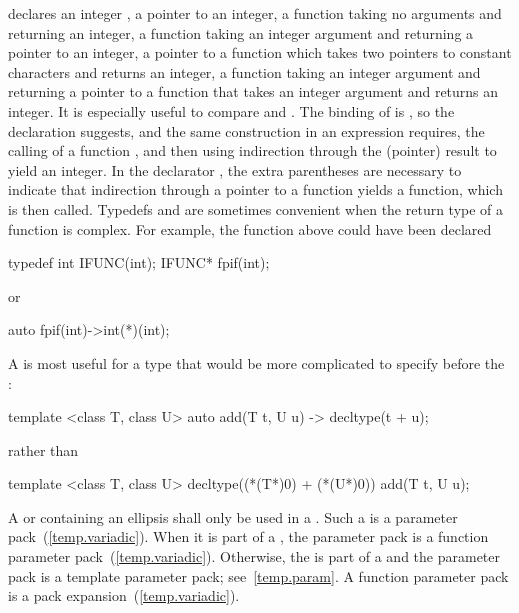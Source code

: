 declares an integer
,
a pointer
to an integer,
a function
taking no arguments and returning an integer,
a function
taking an integer argument and returning a pointer to an integer,
a pointer
to a function which
takes two pointers to constant characters and returns an integer,
a function
taking an integer argument and returning a pointer to a function that takes an integer argument and returns an integer.
It is especially useful to compare
and
.
The binding of
is
,
so the declaration suggests,
and the same construction in an expression
requires, the calling of a function
,
and then using indirection through the (pointer) result
to yield an integer.
In the declarator
,
the extra parentheses are necessary to indicate that indirection through
a pointer to a function yields a function, which is then called.
\exitexample
\enternote
Typedefs and  are sometimes convenient when the return type of a function is complex.
For example,
the function
above could have been declared

\begin{codeblock}
typedef int  IFUNC(int);
IFUNC*  fpif(int);
\end{codeblock}

or

\begin{codeblock}
auto fpif(int)->int(*)(int);
\end{codeblock}

A  is most useful for a type that would be more complicated to specify before the :

\begin{codeblock}
template <class T, class U> auto add(T t, U u) -> decltype(t + u);
\end{codeblock}

rather than

\begin{codeblock}
template <class T, class U> decltype((*(T*)0) + (*(U*)0)) add(T t, U u);
\end{codeblock}
\exitnote

\pnum
A  or 
containing an ellipsis shall only
be used in a . Such a
 is a parameter
pack~(\ref{temp.variadic}). When it is part of a
, the parameter pack is a
function parameter pack~(\ref{temp.variadic}). \enternote
Otherwise, the  is part of a
 and the parameter pack is a
template parameter pack; see~\ref{temp.param}. \exitnote
A function parameter pack is a pack expansion~(\ref{temp.variadic}).
\enterexample

